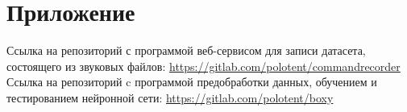 \documentclass[14pt]{article}
\begin{document}
\section*{Приложение}
Ссылка на репозиторий с программой веб-сервисом для записи датасета, состоящего из звуковых файлов: \url{https://gitlab.com/polotent/commandrecorder} \\

Ссылка на репозиторий c программой предобработки данных, обучением и тестированием нейронной сети: \url{https://gitlab.com/polotent/boxy}
\restoregeometry
\end{document}
